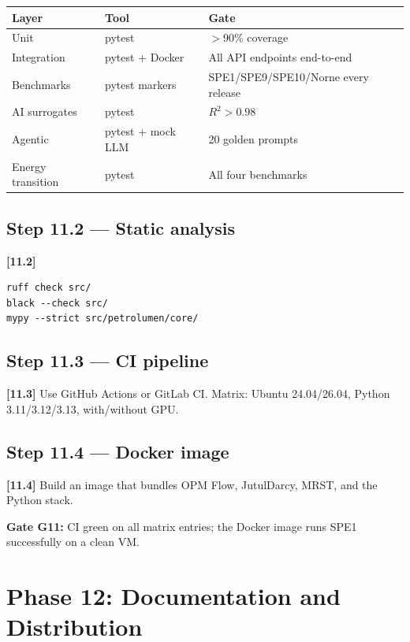 \documentclass[10pt,a4paper]{article}
\newcommand{\stepID}[1]{\textsf{\textbf{[#1]}}}
\begin{document}
\begin{longtable}{@{}p{3cm}p{4cm}p{6cm}@{}}
\toprule
Layer & Tool & Gate\\
\midrule
Unit & pytest & $>$90\% coverage\\
Integration & pytest + Docker & All API endpoints end-to-end\\
Benchmarks & pytest markers & SPE1/SPE9/SPE10/Norne every release\\
AI surrogates & pytest & $R^2 > 0.98$\\
Agentic & pytest + mock LLM & 20 golden prompts\\
Energy transition & pytest & All four benchmarks\\
\bottomrule
\end{longtable}

\subsection{Step 11.2 --- Static analysis}

\stepID{11.2}
\begin{lstlisting}[style=sh]
ruff check src/
black --check src/
mypy --strict src/petrolumen/core/
\end{lstlisting}

\subsection{Step 11.3 --- CI pipeline}

\stepID{11.3} Use GitHub Actions or GitLab CI. Matrix: Ubuntu 24.04/26.04, Python 3.11/3.12/3.13, with/without GPU.

\subsection{Step 11.4 --- Docker image}

\stepID{11.4} Build an image that bundles OPM Flow, JutulDarcy, MRST, and the Python stack.

\begin{gate}
\textbf{Gate G11:} CI green on all matrix entries; the Docker image runs SPE1 successfully on a clean VM.
\end{gate}

\section{Phase 12: Documentation and Distribution}
\label{sec:phase12}
\end{document}
